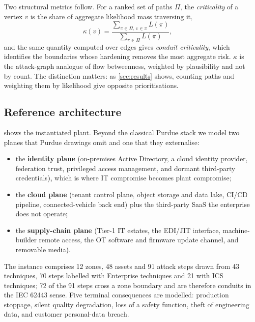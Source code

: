 Two structural metrics follow. For a ranked set of paths $\Pi$, the
\emph{criticality} of a vertex $v$ is the share of aggregate likelihood mass
traversing it,
\begin{equation}
\kappa(v) = \frac{\sum_{\pi \in \Pi,\, v \in \pi} L(\pi)}{\sum_{\pi \in \Pi} L(\pi)},
\end{equation}
and the same quantity computed over edges gives \emph{conduit criticality},
which identifies the boundaries whose hardening removes the most aggregate
risk. $\kappa$ is the attack-graph analogue of flow betweenness, weighted by
plausibility and not by count. The distinction matters: as \cref{sec:results}
shows, counting paths and weighting them by likelihood give opposite
prioritisations.

\subsection{Reference architecture}

 shows the instantiated plant. Beyond the classical
Purdue stack we model two planes that Purdue drawings omit and one that they
externalise:
\begin{itemize}
  \item the \textbf{identity plane} (on-premises Active Directory, a cloud
    identity provider, federation trust, privileged access management, and
    dormant third-party credentials), which is where IT compromise becomes
    plant compromise;
  \item the \textbf{cloud plane} (tenant control plane, object storage and data
    lake, CI/CD pipeline, connected-vehicle back end) plus the third-party SaaS
    the enterprise does not operate;
  \item the \textbf{supply-chain plane} (Tier-1 IT estates, the EDI/JIT
    interface, machine-builder remote access, the OT software and firmware
    update channel, and removable media).
\end{itemize}

The instance comprises 12 zones, 48 assets and 91 attack steps drawn from 43
\attck{} techniques, 70 steps labelled with Enterprise techniques and 21 with
ICS techniques; 72 of the 91 steps cross a zone boundary and are therefore
conduits in the IEC 62443 sense. Five terminal consequences are modelled:
production stoppage, silent quality degradation, loss of a safety function,
theft of engineering data, and customer personal-data breach.



